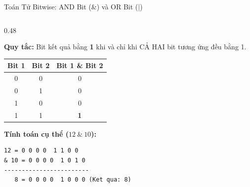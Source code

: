 \documentclass[aspectratio=169, 10pt]{beamer}
\begin{document}
\begin{frame}[fragile]{Toán Tử Bitwise: AND Bit (\&) và OR Bit (|)}
  \begin{columns}[T]
    \begin{column}{0.48\textwidth}
      \begin{tcolorbox}[colback=UniNavy!5,colframe=UniNavy,title=\textbf{Phép AND Bit (\&): Lọc / Xóa Bit},fonttitle=\small\bfseries]
        \textbf{Quy tắc:} Bit kết quả bằng \textbf{1} khi và chỉ khi CẢ HAI bit tương ứng đều bằng 1.
        \begin{table}[h]
          \centering
          \scriptsize
          \begin{tabular}{c c c}
            \toprule
            \textbf{Bit 1} & \textbf{Bit 2} & \textbf{Bit 1 \& Bit 2} \\
            \midrule
            0 & 0 & 0 \\
            0 & 1 & 0 \\
            1 & 0 & 0 \\
            1 & 1 & \textbf{1} \\
            \bottomrule
          \end{tabular}
        \end{table}
        \textbf{Tính toán cụ thể ($12 \ \& \ 10$):}
\begin{lstlisting}[numbers=none]
  12 = 0 0 0 0  1 1 0 0
& 10 = 0 0 0 0  1 0 1 0
------------------------
   8 = 0 0 0 0  1 0 0 0 (Ket qua: 8)
\end{lstlisting}
      \end{tcolorbox}
    \end{column}


\end{columns}
\end{frame}
\end{document}
